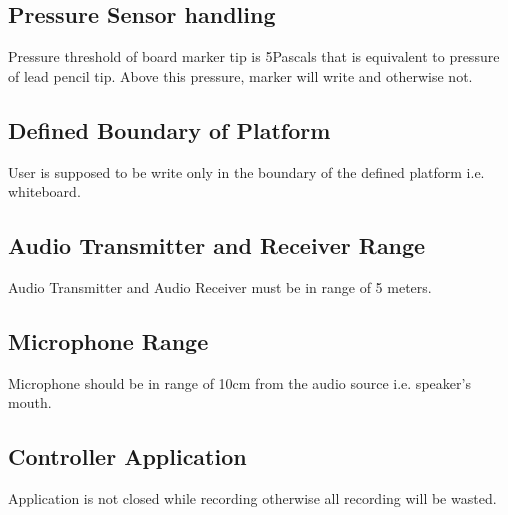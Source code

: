 \subsection{Pressure Sensor handling}
Pressure threshold of board marker tip is 5Pascals that is equivalent to pressure of lead pencil tip. Above this pressure, marker will write and otherwise not.
\bigskip

\subsection{Defined Boundary of Platform}
User is supposed to be write only in the boundary of the defined platform i.e. whiteboard. 
\bigskip

\subsection{Audio Transmitter and Receiver Range}
Audio Transmitter and Audio Receiver must be in range of 5 meters.
\bigskip

\subsection{Microphone Range}
Microphone should be in range of 10cm from the audio source i.e. speaker's mouth.
\bigskip

\subsection{Controller Application}
Application is not closed while recording otherwise all recording will be wasted.
\bigskip







